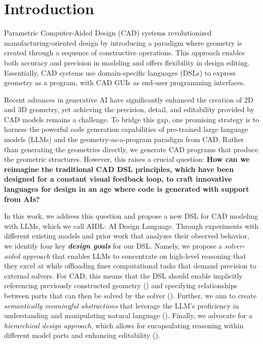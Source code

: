 \section{Introduction}

Parametric Computer-Aided Design (CAD) systems revolutionized manufacturing-oriented design by introducing a paradigm where geometry is created through a sequence of constructive operations. This approach enables both accuracy and precision in modeling and offers flexibility in design editing. Essentially, CAD systems use domain-specific languages (DSLs) to express geometry as a program, with CAD GUIs as end-user programming interfaces.

Recent advances in generative AI have significantly enhanced the creation of 2D and 3D geometry, yet achieving the precision, detail, and editability provided by CAD models remains a challenge. To bridge this gap, one promising strategy is to harness the powerful code generation capabilities of pre-trained large language models (LLMs) and the geometry-as-a-program paradigm from CAD. 
Rather than generating the geometries directly, we generate CAD programs that produce the geometric structures. However, this raises a crucial question: \textbf{How can we reimagine the traditional CAD DSL principles, which have been designed for a constant visual feedback loop, to craft innovative languages for design in an age where code is generated with support from AIs?}

In this work, we address this question and propose a new DSL for CAD modeling with LLMs, which we call AIDL: AI Design Language. Through experiments with different existing models and prior work that analyzes their observed behavior, we identify four key \textbf{\textit{design goals}} for our DSL. Namely, we propose a \textit{solver-aided approach} that enables LLMs to concentrate on high-level reasoning that they excel at while offloading finer computational tasks that demand precision to external solvers. For CAD, this means that the DSL should enable implicitly referencing previously constructed geometry (\dgone{}) and specifying relationships between parts that can then be solved by the solver (\dgtwo{}). Further, we aim to create \textit{semantically meaningful abstractions} that leverage the LLM's proficiency in understanding and manipulating natural language (\dgthree{}). Finally, we advocate for a \textit{hierarchical design approach}, which allows for encapsulating reasoning within different model parts and enhancing editability (\dgfour{}). 

